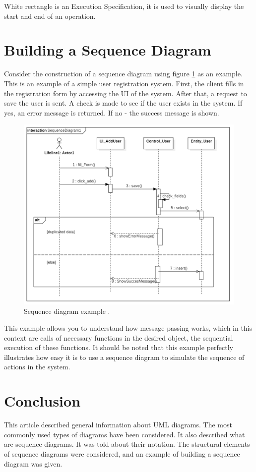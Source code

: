 \documentclass[10pt, twoside, slovak,a4paper]{article}
\begin{document}
White rectangle is an Execution Specification, it is used to visually display the start and end of an operation.
\section{Building a Sequence Diagram} \label{building}

Consider the construction of a sequence diagram using figure \ref{fig:sd_example} as an example. This is an example of a simple user registration system. First, the client fills in the registration form by accessing the UI of the system. After that, a request to save the user is sent. A check is made to see if the user exists in the system. If yes, an error message is returned. If no - the success message is shown.

\begin{figure}[tbh]
	\centering
	\includegraphics[scale=0.7]{Sequence Diagram Example.png}
	\caption{Sequence diagram example \cite{System_analys:Dennis}.}
	\label{fig:sd_example}
\end{figure}

This example allows you to understand how message passing works, which in this context are calls of necessary functions in the desired object, the sequential execution of these functions. It should be noted that this example perfectly illustrates how easy it is to use a sequence diagram to simulate the sequence of actions in the system.

\section{Conclusion} \label{Conclusion} 
This article described general information about UML diagrams. The most commonly used types of diagrams have been considered. It also described what are sequence diagrams. It was told about their notation. The structural elements of sequence diagrams were considered, and an example of building a sequence diagram was given.\\
\end{document}

